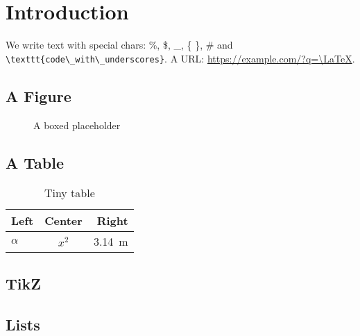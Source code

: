 \documentclass{article}
\begin{document}
\section{Introduction}
We write text with special chars: \%, \$, \_, \{ \}, \# and \verb|\texttt{code\_with\_underscores}|.
A URL: \url{https://example.com/?q=\LaTeX}.

\subsection{A Figure}
\begin{figure}
\centering
\fbox{\rule{0pt}{3cm}\rule{4cm}{0pt}} %
\caption{A boxed placeholder}
\label{fig:box}
\end{figure}

\subsection{A Table}
\begin{table}
\centering
\begin{tabular}{lcr}
\hline
Left & Center & Right\\
\hline
$\alpha$ & $x^2$ & \SI{3.14}{\metre}\\
\hline
\end{tabular}
\caption{Tiny table}
\label{tab:tiny}
\end{table}

\subsection{TikZ}

\subsection{Lists}
\end{document}

